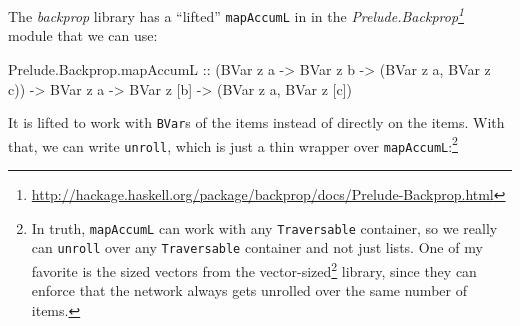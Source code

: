 \documentclass[]{article}
\newenvironment{Shaded}{}{}
\newcommand{\CommentTok}[1]{\textcolor[rgb]{0.38,0.63,0.69}{\textit{#1}}}
\newcommand{\DataTypeTok}[1]{\textcolor[rgb]{0.56,0.13,0.00}{#1}}
\newcommand{\KeywordTok}[1]{\textcolor[rgb]{0.00,0.44,0.13}{\textbf{#1}}}
\newcommand{\NormalTok}[1]{#1}
\newcommand{\OperatorTok}[1]{\textcolor[rgb]{0.40,0.40,0.40}{#1}}
\newcommand{\OtherTok}[1]{\textcolor[rgb]{0.00,0.44,0.13}{#1}}
\renewcommand{\href}[2]{#2\footnote{\url{#1}}}
\begin{document}
The \emph{backprop} library has a ``lifted'' \texttt{mapAccumL} in in the
\emph{\href{http://hackage.haskell.org/package/backprop/docs/Prelude-Backprop.html}{Prelude.Backprop}}
module that we can use:

\begin{Shaded}
\begin{Highlighting}[]
\NormalTok{Prelude.Backprop.mapAccumL}
\OtherTok{    ::}\NormalTok{ (}\DataTypeTok{BVar}\NormalTok{ z a }\OtherTok{{-}>} \DataTypeTok{BVar}\NormalTok{ z b }\OtherTok{{-}>}\NormalTok{ (}\DataTypeTok{BVar}\NormalTok{ z a, }\DataTypeTok{BVar}\NormalTok{ z c))}
    \OtherTok{{-}>} \DataTypeTok{BVar}\NormalTok{ z a}
    \OtherTok{{-}>} \DataTypeTok{BVar}\NormalTok{ z [b]}
    \OtherTok{{-}>}\NormalTok{ (}\DataTypeTok{BVar}\NormalTok{ z a, }\DataTypeTok{BVar}\NormalTok{ z [c])}
\end{Highlighting}
\end{Shaded}

It is lifted to work with \texttt{BVar}s of the items instead of directly on the
items. With that, we can write \texttt{unroll}, which is just a thin wrapper
over \texttt{mapAccumL}:\footnote{In truth, \texttt{mapAccumL} can work with any
  \texttt{Traversable} container, so we really can \texttt{unroll} over any
  \texttt{Traversable} container and not just lists. One of my favorite is the
  sized vectors from the
  \href{http://hackage.haskell.org/package/vector-sized}{vector-sized} library,
  since they can enforce that the network always gets unrolled over the same
  number of items.}

\begin{Shaded}
\end{Shaded}
\end{document}
